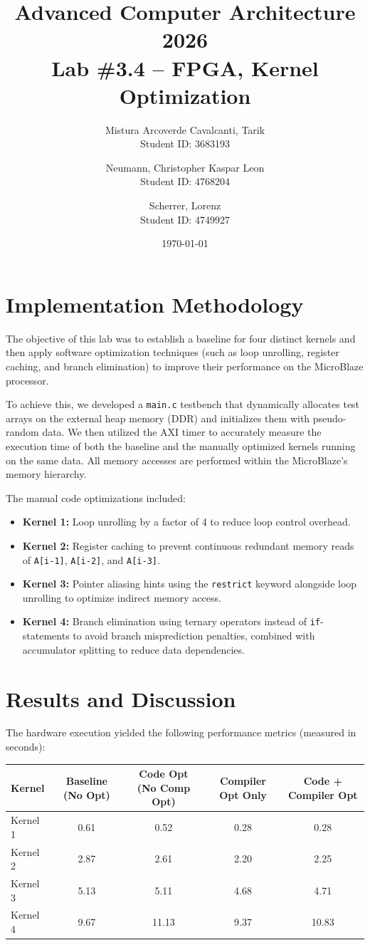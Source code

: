 \documentclass[11pt,a4paper]{article}
\title{Advanced Computer Architecture 2026 \\ 
\large Lab \#3.4 -- FPGA, Kernel Optimization}
\author{
  Mistura Arcoverde Cavalcanti, Tarik \\ \small Student ID: 3683193
  \and
  Neumann, Christopher Kaspar Leon \\ \small Student ID: 4768204
  \and
  Scherrer, Lorenz \\ \small Student ID: 4749927
}
\date{\today}
\begin{document}
\maketitle

\section{Implementation Methodology}
The objective of this lab was to establish a baseline for four distinct kernels and then apply software optimization techniques (such as loop unrolling, register caching, and branch elimination) to improve their performance on the MicroBlaze processor. 

To achieve this, we developed a \texttt{main.c} testbench that dynamically allocates test arrays on the external heap memory (DDR) and initializes them with pseudo-random data. We then utilized the AXI timer to accurately measure the execution time of both the baseline and the manually optimized kernels running on the same data. All memory accesses are performed within the MicroBlaze's memory hierarchy.

The manual code optimizations included:
\begin{itemize}
    \item \textbf{Kernel 1:} Loop unrolling by a factor of 4 to reduce loop control overhead.
    \item \textbf{Kernel 2:} Register caching to prevent continuous redundant memory reads of \texttt{A[i-1]}, \texttt{A[i-2]}, and \texttt{A[i-3]}.
    \item \textbf{Kernel 3:} Pointer aliasing hints using the \texttt{restrict} keyword alongside loop unrolling to optimize indirect memory access.
    \item \textbf{Kernel 4:} Branch elimination using ternary operators instead of \texttt{if}-statements to avoid branch misprediction penalties, combined with accumulator splitting to reduce data dependencies.
\end{itemize}

\section{Results and Discussion}

The hardware execution yielded the following performance metrics (measured in seconds):

\begin{center}
\begin{tabular}{|l|c|c|c|c|}
\hline
\textbf{Kernel} & \textbf{Baseline (No Opt)} & \textbf{Code Opt (No Comp Opt)} & \textbf{Compiler Opt Only} & \textbf{Code + Compiler Opt} \\
\hline
Kernel 1 & 0.61 & 0.52 & 0.28 & 0.28 \\
Kernel 2 & 2.87 & 2.61 & 2.20 & 2.25 \\
Kernel 3 & 5.13 & 5.11 & 4.68 & 4.71 \\
Kernel 4 & 9.67 & 11.13 & 9.37 & 10.83 \\
\hline
\end{tabular}
\end{center}
\end{document}
